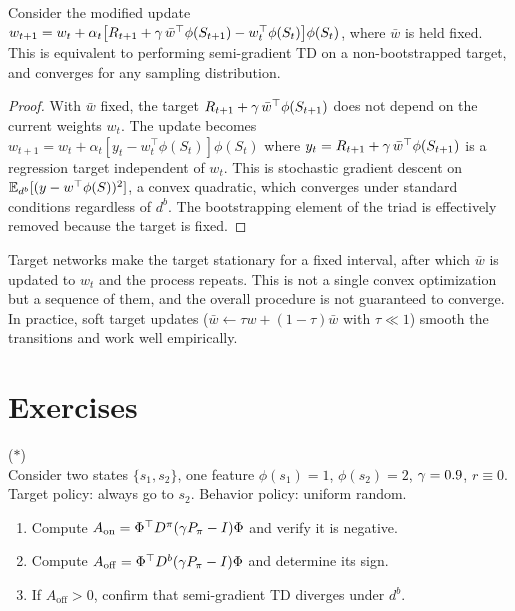 \documentclass[11pt,a4paper]{article}
\begin{document}
\begin{proposition}
\label{prop:target_networks}
Consider the modified update
$w_{t+1} = w_t + \alpha_t\bigl[R_{t+1}
+ \gamma\,\bar{w}^\top\phi(S_{t+1})
- w_t^\top\phi(S_t)\bigr]\phi(S_t)$,
where $\bar{w}$ is held fixed. This is equivalent to performing
semi-gradient TD on a non-bootstrapped target, and converges for
any sampling distribution.
\end{proposition}

\begin{proof}
With $\bar{w}$ fixed, the target $R_{t+1}
+ \gamma\,\bar{w}^\top\phi(S_{t+1})$ does not depend on the
current weights $w_t$. The update becomes
$w_{t+1} = w_t + \alpha_t[y_t - w_t^\top\phi(S_t)]\phi(S_t)$
where $y_t = R_{t+1} + \gamma\,\bar{w}^\top\phi(S_{t+1})$ is a
regression target independent of $w_t$. This is stochastic gradient
descent on $\mathbb{E}_{d^b}[(y - w^\top\phi(S))^2]$, a convex quadratic,
which converges under standard conditions regardless of $d^b$.
The bootstrapping element of the triad is effectively removed because
the target is fixed.
\end{proof}

\begin{remark}
\label{rem:target_limitations}
Target networks make the target stationary for a fixed interval,
after which $\bar{w}$ is updated to $w_t$ and the process repeats.
This is not a single convex optimization but a sequence of them,
and the overall procedure is not guaranteed to converge. In practice,
soft target updates ($\bar{w} \leftarrow \tau w + (1-\tau)\bar{w}$
with $\tau \ll 1$) smooth the transitions and work well empirically.
\end{remark}

\section{Exercises}
\label{sec:exercises}

\begin{exercise}
\textnormal{(\(*\))} \\
Consider two states $\{s_1, s_2\}$, one feature $\phi(s_1) = 1$,
$\phi(s_2) = 2$, $\gamma = 0.9$, $r \equiv 0$. Target policy:
always go to $s_2$. Behavior policy: uniform random.
\begin{enumerate}[nosep]
  \item[(a)] Compute $A_{\mathrm{on}} = \Phi^\top D^\pi
    (\gamma P_\pi - I)\Phi$ and verify it is negative.
  \item[(b)] Compute $A_{\mathrm{off}} = \Phi^\top D^b
    (\gamma P_\pi - I)\Phi$ and determine its sign.
  \item[(c)] If $A_{\mathrm{off}} > 0$, confirm that semi-gradient
    TD diverges under $d^b$.
\end{enumerate}
\end{exercise}
\end{document}
